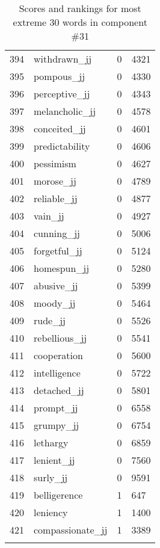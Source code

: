 \begin{longtable}[!htbp]{| rlr@{.}l |}
    394 & withdrawn\_jj & 0 & 4321 \\
    395 & pompous\_jj & 0 & 4330 \\
    396 & perceptive\_jj & 0 & 4343 \\
    397 & melancholic\_jj & 0 & 4578 \\
    398 & conceited\_jj & 0 & 4601 \\
    399 & predictability & 0 & 4606 \\
    400 & pessimism & 0 & 4627 \\
    401 & morose\_jj & 0 & 4789 \\
    402 & reliable\_jj & 0 & 4877 \\
    403 & vain\_jj & 0 & 4927 \\
    404 & cunning\_jj & 0 & 5006 \\
    405 & forgetful\_jj & 0 & 5124 \\
    406 & homespun\_jj & 0 & 5280 \\
    407 & abusive\_jj & 0 & 5399 \\
    408 & moody\_jj & 0 & 5464 \\
    409 & rude\_jj & 0 & 5526 \\
    410 & rebellious\_jj & 0 & 5541 \\
    411 & cooperation & 0 & 5600 \\
    412 & intelligence & 0 & 5722 \\
    413 & detached\_jj & 0 & 5801 \\
    414 & prompt\_jj & 0 & 6558 \\
    415 & grumpy\_jj & 0 & 6754 \\
    416 & lethargy & 0 & 6859 \\
    417 & lenient\_jj & 0 & 7560 \\
    418 & surly\_jj & 0 & 9591 \\
    419 & belligerence & 1 & 647 \\
    420 & leniency & 1 & 1400 \\
    421 & compassionate\_jj & 1 & 3389 \\
    \hline
    \caption{Scores and rankings for most extreme 30 words in component \#31} \\
\end{longtable}
